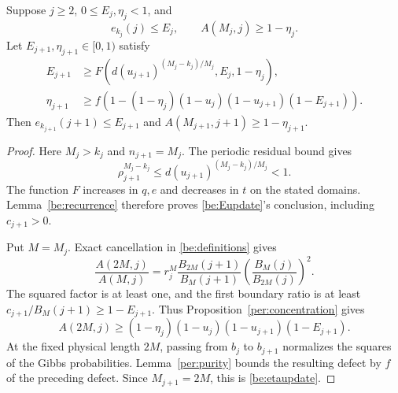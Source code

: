 \begin{proposition}\label{be:coupled}
Suppose $j\ge2$, $0\le E_j,\eta_j<1$, and
\[
 e_{k_j}(j)\le E_j,\qquad A(M_j,j)\ge1-\eta_j.
\]
Let $E_{j+1},\eta_{j+1}\in[0,1)$ satisfy
\begin{align}
 E_{j+1}&\ge
 F\left(d(u_{j+1})^{(M_j-k_j)/M_j},E_j,1-\eta_j\right),
                                                   \label{be:Eupdate}\\
 \eta_{j+1}&\ge f\left(1-(1-\eta_j)(1-u_j)(1-u_{j+1})
                                      (1-E_{j+1})\right).
                                                   \label{be:etaupdate}
\end{align}
Then $e_{k_{j+1}}(j+1)\le E_{j+1}$ and
$A(M_{j+1},j+1)\ge1-\eta_{j+1}$.
\end{proposition}
\begin{proof}
Here $M_j>k_j$ and $n_{j+1}=M_j$. The periodic residual bound gives
\[
 \rho_{j+1}^{M_j-k_j}\le d(u_{j+1})^{(M_j-k_j)/M_j}<1.
\]
The function $F$ increases in $q,e$ and decreases in $t$ on the stated
domains. Lemma~\ref{be:recurrence} therefore proves
\eqref{be:Eupdate}'s conclusion, including $c_{j+1}>0$.

Put $M=M_j$. Exact cancellation in \eqref{be:definitions} gives
\begin{equation}\label{be:physical-cancellation}
 \frac{A(2M,j)}{A(M,j)}
 =r_j^M\frac{B_{2M}(j+1)}{B_M(j+1)}
             \left(\frac{B_M(j)}{B_{2M}(j)}\right)^2.
\end{equation}
The squared factor is at least one, and the first boundary ratio is
at least $c_{j+1}/B_M(j+1)\ge1-E_{j+1}$. Thus
Proposition~\ref{per:concentration} gives
\[
 A(2M,j)\ge(1-\eta_j)(1-u_j)(1-u_{j+1})(1-E_{j+1}).
\]
At the fixed physical length $2M$, passing from $b_j$ to $b_{j+1}$
normalizes the squares of the Gibbs probabilities.
Lemma~\ref{per:purity} bounds the resulting defect by $f$ of the
preceding defect. Since $M_{j+1}=2M$, this is
\eqref{be:etaupdate}.
\end{proof}
